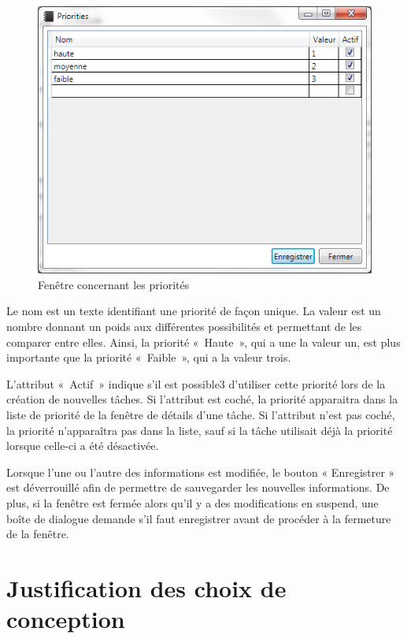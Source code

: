 \documentclass[letterpaper, oneside, 12pt, these, creativecommons]{thETS}
\begin{document}
\begin{figure}
	\includegraphics[scale=0.85]{fenetre_priorite.png}
	\caption{Fenêtre concernant les priorités}
\end{figure}

Le nom est un texte identifiant une priorité de façon unique. La valeur est un nombre donnant un poids aux différentes possibilités et permettant de les comparer entre elles. Ainsi, la priorité « Haute », qui a une la valeur un, est plus importante que la priorité « Faible », qui a la valeur trois.

L'attribut « Actif » indique s'il est possible3 d'utiliser cette priorité lors de la création de nouvelles tâches. Si l'attribut est coché, la priorité apparaitra dans la liste de priorité de la fenêtre de détails d'une tâche. Si l'attribut n'est pas coché, la priorité n'apparaîtra pas dans la liste, sauf si la tâche utilisait déjà la priorité lorsque celle-ci a été désactivée.

Lorsque l'une ou l'autre des informations est modifiée, le bouton « Enregistrer » est déverrouillé afin de permettre de sauvegarder les nouvelles informations. De plus, si la fenêtre est fermée alors qu'il y a des modifications en suspend, une boîte de dialogue demande s'il faut enregistrer avant de procéder à la fermeture de la fenêtre.

\newpage

\section{Justification des choix de conception}
\end{document}
